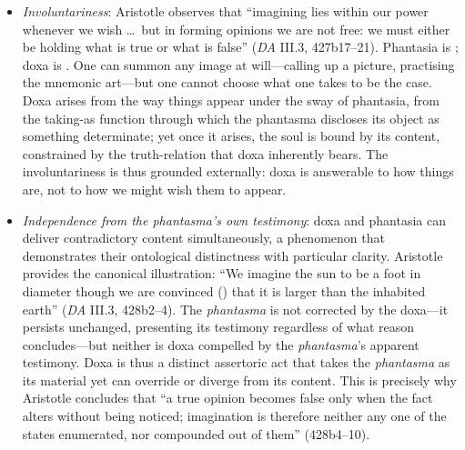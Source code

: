 \begin{itemize}
\begin{itemize}
\begin{itemize}
\begin{enumerate}
                  \begin{itemize}
                      \item \textit{Involuntariness}: Aristotle observes that
                      ``imagining lies within our power whenever we wish \ldots\ but
                      in forming opinions we are not free: we must either be holding
                      what is true or what is false'' (\textit{DA} III.3, 427b17--21).
                      Phantasia is ; doxa is . One
                      can summon any image at will---calling up a picture, practising
                      the mnemonic art---but one cannot choose what one takes to be
                      the case. Doxa arises from the way things appear under the sway
                      of phantasia, from the taking-as function through which the
                      phantasma discloses its object as something determinate; yet once
                      it arises, the soul is bound by its content, constrained by the
                      truth-relation that doxa inherently bears. The involuntariness
                      is thus grounded externally: doxa is answerable to how things
                      are, not to how we might wish them to appear.
                      \item \textit{Independence from the phantasma's own testimony}:
                      doxa and phantasia can deliver contradictory content
                      simultaneously, a phenomenon that demonstrates their ontological
                      distinctness with particular clarity. Aristotle provides the
                      canonical illustration: ``We imagine the sun to be a foot in
                      diameter though we are convinced () that it is
                      larger than the inhabited earth'' (\textit{DA} III.3, 428b2--4).
                      The \textit{phantasma} is not corrected by the doxa---it
                      persists unchanged, presenting its testimony regardless of what
                      reason concludes---but neither is doxa compelled by the
                      \textit{phantasma}'s apparent testimony. Doxa is thus a distinct
                      assertoric act that takes the \textit{phantasma} as its material
                      yet can override or diverge from its content. This is precisely
                      why Aristotle concludes that ``a true opinion becomes false only
                      when the fact alters without being noticed; imagination is
                      therefore neither any one of the states enumerated, nor
                      compounded out of them'' (428b4--10).
                  \end{itemize}


\end{enumerate}
\end{itemize}
\end{itemize}
\end{itemize}
